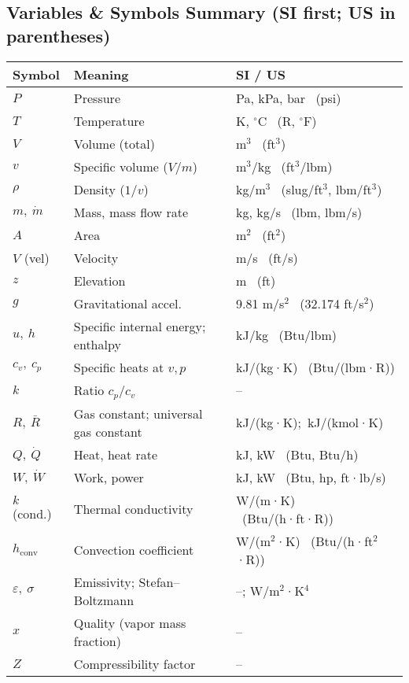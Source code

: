 \documentclass[10pt]{article}
\begin{document}
\begin{multicols}{2}

\section{Variables \& Symbols Summary (SI first; US in parentheses)}
\begin{tabularx}{\linewidth}{l l l}
\toprule
\textbf{Symbol} & \textbf{Meaning} & \textbf{SI / US} \\
\midrule
$P$ & Pressure & Pa, kPa, bar \ (psi) \\
$T$ & Temperature & K, ${}^{\circ}$C \ (R, ${}^{\circ}$F) \\
$V$ & Volume (total) & m$^3$ \ (ft$^3$) \\
$v$ & Specific volume ($V/m$) & m$^3$/kg \ (ft$^3$/lbm) \\
$\rho$ & Density ($1/v$) & kg/m$^3$ \ (slug/ft$^3$, lbm/ft$^3$) \\
$m,\ \dot m$ & Mass, mass flow rate & kg, kg/s \ (lbm, lbm/s) \\
$A$ & Area & m$^2$ \ (ft$^2$) \\
$V$ (vel) & Velocity & m/s \ (ft/s) \\
$z$ & Elevation & m \ (ft) \\
$g$ & Gravitational accel. & 9.81 m/s$^2$ \ (32.174 ft/s$^2$) \\
$u,\ h$ & Specific internal energy; enthalpy & kJ/kg \ (Btu/lbm) \\
$c_v,\ c_p$ & Specific heats at $v,p$ & kJ/(kg·K) \ (Btu/(lbm·R)) \\
$k$ & Ratio $c_p/c_v$ & -- \\
$R,\ \bar R$ & Gas constant; universal gas constant & kJ/(kg·K);\ kJ/(kmol·K) \\
$Q,\ \dot Q$ & Heat, heat rate & kJ, kW \ (Btu, Btu/h) \\
$W,\ \dot W$ & Work, power & kJ, kW \ (Btu, hp, ft·lb/s) \\
$k$ (cond.) & Thermal conductivity & W/(m·K) \ (Btu/(h·ft·R)) \\
$h_{\text{conv}}$ & Convection coefficient & W/(m$^2$·K) \ (Btu/(h·ft$^2$·R)) \\
$\varepsilon,\ \sigma$ & Emissivity; Stefan–Boltzmann & --; W/m$^2$·K$^4$ \\
$x$ & Quality (vapor mass fraction) & -- \\
$Z$ & Compressibility factor & -- \\
\bottomrule
\end{tabularx}


\end{multicols}
\end{document}
